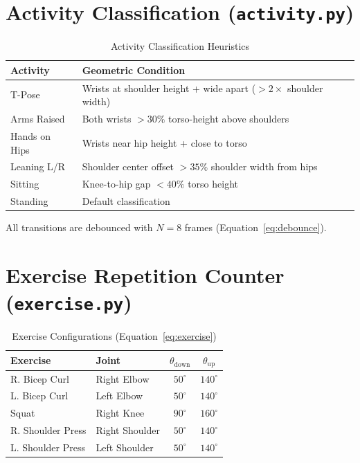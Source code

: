 \documentclass[a4paper,12pt]{report}
\begin{document}
\section{Activity Classification (\texttt{activity.py})}

\begin{table}[H]
\centering
\begin{tabular}{|l|l|}
\hline
\textbf{Activity} & \textbf{Geometric Condition} \\
\hline
T-Pose & Wrists at shoulder height + wide apart ($> 2\times$ shoulder width) \\
Arms Raised & Both wrists $> 30\%$ torso-height above shoulders \\
Hands on Hips & Wrists near hip height + close to torso \\
Leaning L/R & Shoulder center offset $> 35\%$ shoulder width from hips \\
Sitting & Knee-to-hip gap $< 40\%$ torso height \\
Standing & Default classification \\
\hline
\end{tabular}
\caption{Activity Classification Heuristics}
\label{tab:activities}
\end{table}

All transitions are debounced with $N = 8$ frames (Equation~\ref{eq:debounce}).

\section{Exercise Repetition Counter (\texttt{exercise.py})}

\begin{table}[H]
\centering
\begin{tabular}{|l|l|c|c|}
\hline
\textbf{Exercise} & \textbf{Joint} & $\theta_{\text{down}}$ & $\theta_{\text{up}}$ \\
\hline
R. Bicep Curl & Right Elbow & $50^{\circ}$ & $140^{\circ}$ \\
L. Bicep Curl & Left Elbow & $50^{\circ}$ & $140^{\circ}$ \\
Squat & Right Knee & $90^{\circ}$ & $160^{\circ}$ \\
R. Shoulder Press & Right Shoulder & $50^{\circ}$ & $140^{\circ}$ \\
L. Shoulder Press & Left Shoulder & $50^{\circ}$ & $140^{\circ}$ \\
\hline
\end{tabular}
\caption{Exercise Configurations (Equation~\ref{eq:exercise})}
\label{tab:exercise}
\end{table}
\end{document}
